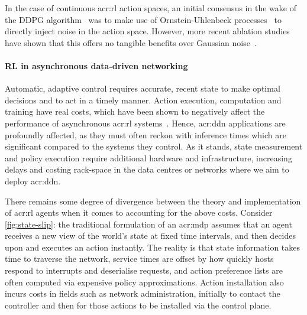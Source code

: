 In the case of continuous \gls{acr:rl} action spaces, an initial consensus in the wake of the DDPG algorithm~\parencite{DBLP:journals/corr/LillicrapHPHETS15} was to make use of Ornstein-Uhlenbeck processes~\parencite{PhysRev.36.823} to directly inject noise in the action space.
However, more recent ablation studies have shown that this offers no tangible benefits over Gaussian noise~\parencite{DBLP:conf/icml/FujimotoHM18,DBLP:conf/iclr/Barth-MaronHBDH18}.

\paragraph{RL in asynchronous data-driven networking}
Automatic, adaptive control requires accurate, recent state to make optimal decisions and to act in a timely manner.
Action execution, computation and training have real costs, which have been shown to negatively affect the performance of asynchronous \gls{acr:rl} systems~\parencite{DBLP:journals/firai/TravnikMSP18}.
Hence, \gls{acr:ddn} applications are profoundly affected, as they must often reckon with inference times which are significant compared to the systems they control.
As it stands, state measurement and policy execution require additional hardware and infrastructure, increasing delays and costing rack-space in the data centres or networks where we aim to deploy \gls{acr:ddn}.

There remains some degree of divergence between the theory and implementation of \gls{acr:rl} agents when it comes to accounting for the above costs.
Consider \cref{fig:state-slip}: the traditional formulation of an \gls{acr:mdp} assumes that an agent receives a new view of the world's state at fixed time intervals, and then decides upon and executes an action instantly.
The reality is that state information takes time to traverse the network, service times are offset by how quickly hosts respond to interrupts and deserialise requests, and action preference lists are often computed via expensive policy approximations.
Action installation also incurs costs in fields such as network administration, initially to contact the controller and then for those actions to be installed via the control plane.

